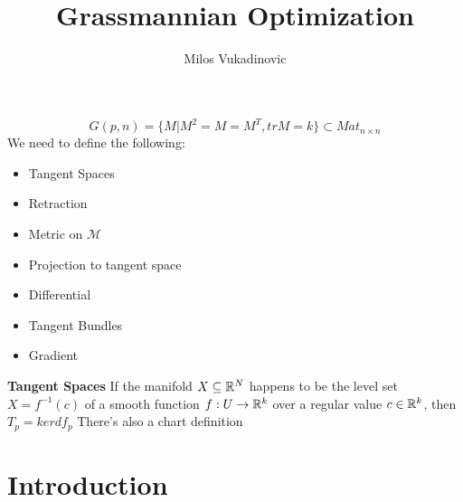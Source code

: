 \documentclass[11pt,a4paper]{report}
\author{Milos Vukadinovic}
\title{Grassmannian Optimization}
\begin{document}
\maketitle
\setcounter{tocdepth}{1}
\tableofcontents
$$ G(p,n) = \{ M | M^2 = M = M^T, tr M = k \} \subset Mat_{n \times n}$$
We need to define the following:
\begin{itemize}
      \item Tangent Spaces
      \item Retraction
      \item Metric on $\mathcal{M}$
      \item Projection to tangent space
      \item Differential
      \item Tangent Bundles
      \item Gradient
\end{itemize}
\textbf{Tangent Spaces}
If the manifold $X \subseteq \mathbb{R}^N$ happens to be the level set $X = f^{-1}(c)$ of a smooth function
$f: U \to \mathbb{R}^k$ over a regular value $c \in \mathbb{R}^k$, then $T_p = ker df_p$
There's also a chart definition
      \chapter{Introduction}
      \cite{chatterjee_thesis}
 
 
 
 
 
 
 
 
 
 
 


 
 
\end{document}

